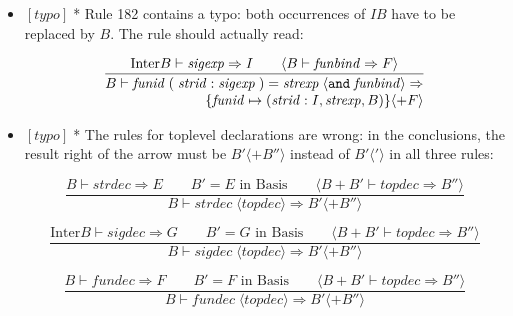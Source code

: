 \documentclass{article}
\newcommand{\m}[1]{$[\mathit{#1}]\;$}
\newcommand{\typo}{\m{typo}}
\begin{document}
\begin{itemize}
\item \typo * Rule 182 contains a typo: both occurrences of $\mathit{IB}$ have to be replaced by $B$. The rule should actually read:

\setcounter{equation}{181}
\begin{equation}
\frac{
\mbox{Inter} B \vdash \mathit{sigexp} \Rightarrow I
\qquad
\langle B \vdash \mathit{funbind} \Rightarrow F \rangle
}{
\begin{array}{@{}r@{}}
B \vdash \mathit{funid}\;{\tt(}\;\mathit{strid}\;{\tt:}\;\mathit{sigexp}\;{\tt)}
  \;{\tt=}\;\mathit{strexp}\; \langle {\tt and}\;\mathit{funbind} \rangle
  \Rightarrow \\
\{ \mathit{funid} \mapsto (\mathit{strid}:I, \mathit{strexp}, B) \}
  \langle + F \rangle
\end{array}
}
\end{equation}

\item \typo * The rules for toplevel declarations are wrong: in the conclusions, the result right of the arrow must be $B' \langle+ B''\rangle$ instead of $B'\langle'\rangle$ in all three rules:

\setcounter{equation}{183}
\begin{equation}
\frac{
B \vdash \mathit{strdec} \Rightarrow E
\qquad
B' = \mbox{$E$ in Basis}
\qquad
\langle B+B' \vdash \mathit{topdec} \Rightarrow B'' \rangle
}{
B \vdash \mathit{strdec}\; \langle\mathit{topdec}\rangle
  \Rightarrow B' \langle+ B''\rangle
}
\end{equation}

\begin{equation}
\frac{
\mbox{Inter} B \vdash \mathit{sigdec} \Rightarrow G
\qquad
B' = \mbox{$G$ in Basis}
\qquad
\langle B+B' \vdash \mathit{topdec} \Rightarrow B'' \rangle
}{
B \vdash \mathit{sigdec}\; \langle\mathit{topdec}\rangle
  \Rightarrow B' \langle+ B''\rangle
}
\end{equation}

\begin{equation}
\frac{
B \vdash \mathit{fundec} \Rightarrow F
\qquad
B' = \mbox{$F$ in Basis}
\qquad
\langle B+B' \vdash \mathit{topdec} \Rightarrow B'' \rangle
}{
B \vdash \mathit{fundec}\; \langle\mathit{topdec}\rangle
  \Rightarrow B' \langle+ B''\rangle
}
\end{equation}
\end{itemize}
\end{document}
